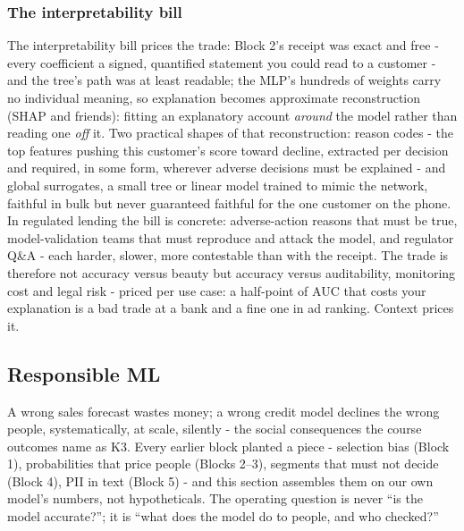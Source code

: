 \documentclass[11pt,a4paper]{article}
\begin{document}
\subsubsection{The interpretability bill}
The interpretability bill prices the trade: Block 2's receipt was exact
and free - every coefficient a signed, quantified statement you could
read to a customer - and the tree's path was at least readable; the
MLP's hundreds of weights carry no individual meaning, so explanation
becomes approximate reconstruction (SHAP and friends): fitting an
explanatory account \emph{around} the model rather than reading one
\emph{off} it. Two practical shapes of that reconstruction: reason codes
- the top features pushing this customer's score toward decline,
extracted per decision and required, in some form, wherever adverse
decisions must be explained - and global surrogates, a small tree or
linear model trained to mimic the network, faithful in bulk but never
guaranteed faithful for the one customer on the phone. In regulated
lending the bill is concrete: adverse-action reasons that must be true,
model-validation teams that must reproduce and attack the model, and
regulator Q\&A - each harder, slower, more contestable than with the
receipt. The trade is therefore not accuracy versus beauty but accuracy
versus auditability, monitoring cost and legal risk - priced per use
case: a half-point of AUC that costs your explanation is a bad trade at
a bank and a fine one in ad ranking. Context prices it.

\subsection{Responsible ML}
A wrong sales forecast wastes money; a wrong credit model declines the
wrong people, systematically, at scale, silently - the social
consequences the course outcomes name as K3. Every earlier block planted
a piece - selection bias (Block 1), probabilities that price people
(Blocks 2--3), segments that must not decide (Block 4), PII in text
(Block 5) - and this section assembles them on our own model's numbers,
not hypotheticals. The operating question is never ``is the model
accurate?''; it is ``what does the model do to people, and who
checked?''
\end{document}
